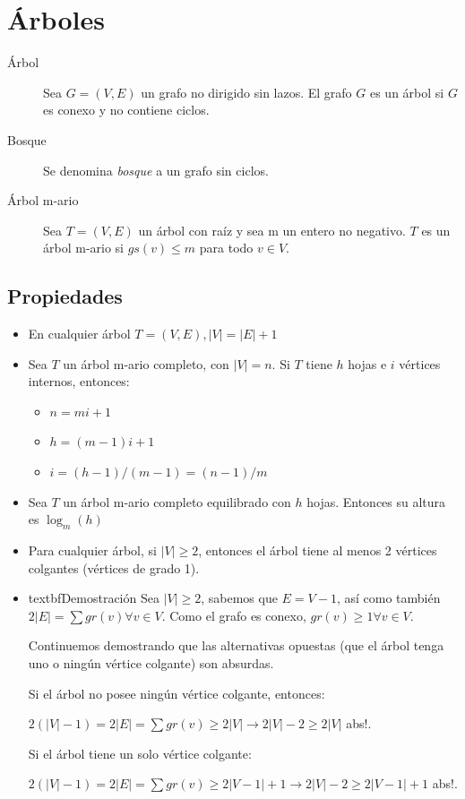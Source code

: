 \newpage
\section{Árboles}
\begin{description}
	\item[Árbol] Sea $G = (V,E)$ un grafo no dirigido sin lazos. El grafo $G$ es un árbol si $G$ es conexo y no contiene ciclos.
	\item[Bosque] Se denomina \emph{bosque} a un grafo sin ciclos.
	\item[Árbol m-ario] Sea $T=(V,E)$ un árbol con raíz y sea m un entero no negativo. $T$ es un árbol m-ario si $gs(v) \leq m$ para todo $v \in V$.
\end{description}

\subsection{Propiedades}
\begin{itemize}
	\item En cualquier árbol $T = (V,E), |V| = |E| + 1$
	\item Sea $T$ un árbol m-ario completo, con $|V| = n $. Si $T$ tiene $h$ hojas e $i$ vértices internos, entonces:
	\begin{itemize}
		\item $n = mi +1$
		\item $h = (m-1)i +1$
		\item $i = (h-1)/(m-1) = (n-1)/m$
	\end{itemize}
	\item Sea $T$ un árbol m-ario completo equilibrado con $h$ hojas. Entonces su altura es $\log _m \left( h \right)$
	\item Para cualquier árbol, si $|V| \geq 2$, entonces el árbol tiene al menos 2 vértices colgantes (vértices de grado 1).
	
	\item textbf{Demostración} Sea $|V| \ge 2$, sabemos que $E = V - 1$, así como también $2 |E| = \sum gr(v) \forall v \in V$. Como el grafo es conexo, $gr(v) \ge 1 \forall v \in V$.
	
	Continuemos demostrando que las alternativas opuestas (que el árbol tenga uno o ningún vértice colgante) son absurdas.
	
	Si el árbol no posee ningún vértice colgante, entonces:
	
	$2 (|V| - 1) = 2 |E| = \sum gr(v) \ge 2 |V| \rightarrow 2 |V| - 2 \ge 2 |V|$ abs!.
	
	Si el árbol tiene un solo vértice colgante:
	
	$2 (|V| - 1) = 2 |E| = \sum gr(v) \ge 2 |V - 1| + 1\rightarrow 2 |V| - 2 \ge 2 |V - 1| + 1$ abs!.
\end{itemize}

